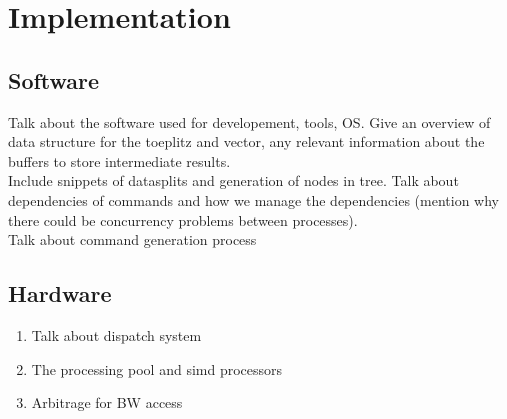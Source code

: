 \chapter{Implementation}
\section{Software}
Talk about the software used for developement, tools, OS. 
Give an overview of data structure for the toeplitz and vector, 
any relevant information about the buffers to store intermediate 
results. \\ Include snippets of datasplits and 
generation of nodes in tree. Talk about dependencies of 
commands and how we manage the dependencies (mention why 
there could be concurrency problems between processes). 
\\ Talk about command generation process 
\section{Hardware} 
\begin{enumerate}
	\item Talk about dispatch system 
	\item The processing pool and simd processors 
	\item Arbitrage for BW access 
\end{enumerate}






